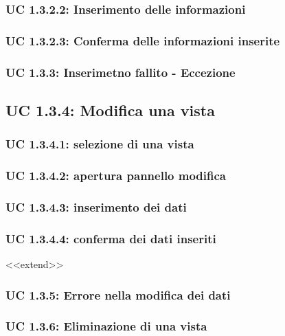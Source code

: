 \subsubsection{UC 1.3.2.2: Inserimento delle informazioni}

\subsubsection{UC 1.3.2.3: Conferma delle informazioni inserite}

\subsubsection{UC 1.3.3: Inserimetno fallito - Eccezione}

\subsection{UC 1.3.4: Modifica una vista}

\subsubsection{UC 1.3.4.1: selezione di una vista}

\subsubsection{UC 1.3.4.2: apertura pannello modifica}

\subsubsection{UC 1.3.4.3: inserimento dei dati}

\subsubsection{UC 1.3.4.4: conferma dei dati inseriti}

<<extend>>

\subsubsection{UC 1.3.5: Errore nella modifica dei dati}

\subsubsection{UC 1.3.6: Eliminazione di una vista}


